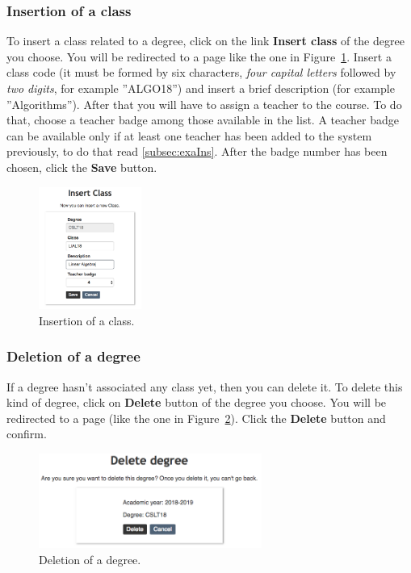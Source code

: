 \subsubsection{Insertion of a class} \label{sssec:clsIns}
To insert a class related to a degree, click on the link \textbf{Insert class} of the degree you choose. You will be redirected to a page like the one in Figure~\ref{fig:insertDidacticActivity}. Insert a class code (it must be formed by six characters, \emph{four capital letters} followed by \emph{two digits}, for example ''ALGO18'') and insert a brief description (for example ''Algorithms''). After that you will have to assign a teacher to the course. To do that, choose a teacher badge among those available in the list. A teacher badge can be available only if at least one teacher has been added to the system previously, to do that read \ref{subsec:exaIns}. After the badge number has been chosen, click the \textbf{Save} button.%
\begin{figure}[H]
  \centering
  \includegraphics[width=0.30\textwidth]{img/insertDidacticActivity.png}
  \caption{Insertion of a class.}
  \label{fig:insertDidacticActivity}
\end{figure}

\subsubsection{Deletion of a degree}
If a degree hasn't associated any class yet, then you can delete it. To delete this kind of degree, click on \textbf{Delete} button of the degree you choose. You will be redirected to a page (like the one in Figure~\ref{fig:deleteDegree}). Click the \textbf{Delete} button and confirm.%
\begin{figure}[H]
  \centering
  \includegraphics[width=0.65\textwidth]{img/deleteDegree.png}
  \caption{Deletion of a degree.}
  \label{fig:deleteDegree}
\end{figure}


